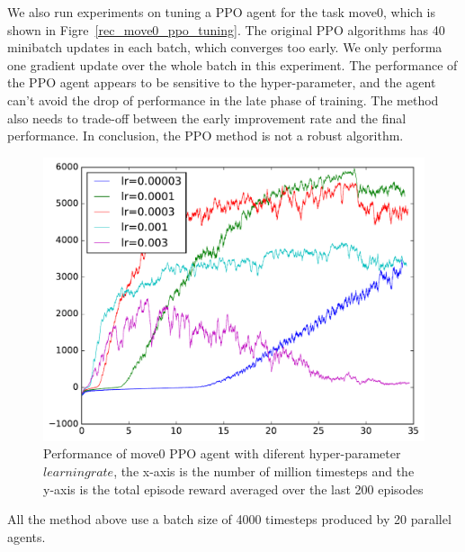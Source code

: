 We also run experiments on tuning a PPO agent for the task move0, which is shown in Figre~\ref{rec_move0_ppo_tuning}. The original PPO algorithms has 40 minibatch updates in each batch, which converges too early. We only performa one gradient update over the whole batch in this experiment. The performance of the PPO agent appears to be sensitive to the hyper-parameter, and the agent can't avoid the drop of performance in the late phase of training. The method also needs to trade-off between the early improvement rate and the final performance. In conclusion, the PPO method is not a robust algorithm.
\begin{figure}[h]
\includegraphics[width=\textwidth]{images/rec_move0_ppo_tuning.pdf}
\centering
\caption{Performance of move0 PPO agent with diferent hyper-parameter $learning rate$, the x-axis is the number of million timesteps and the y-axis is the total episode reward averaged over the last 200 episodes}
\end{figure}\label{rec_move0_ppo_tuning}

All the method above use a batch size of 4000 timesteps produced by 20 parallel agents.


